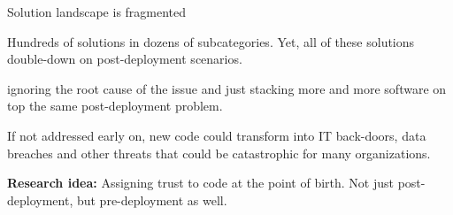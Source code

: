\begin{frame}[fragile]{Solution landscape is fragmented}
  \setlength{\leftmarginii}{0.2cm}
  \begin{wideitemize}
    \item Hundreds of solutions in dozens of subcategories. {\small Yet, all of these
      solutions double-down on post-deployment scenarios.}
    \begin{wideitemize}
      \item {} ignoring the root cause of the issue and just stacking more
      and more software on top the same post-deployment problem.
      \item If not addressed early on, new code could transform into IT back-doors,
      data breaches and other threats that could be catastrophic for many organizations.
    \end{wideitemize}
    \item \textbf{Research idea:} Assigning trust to code at the point of birth. Not
    just post-deployment, but pre-deployment as well.
  \end{wideitemize}
\end{frame}



